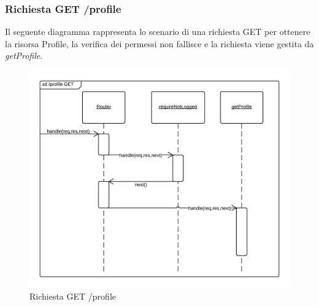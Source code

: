 \subsubsection{Richiesta GET /profile}
Il seguente diagramma rappresenta lo scenario di una richiesta GET per ottenere la risorsa Profile, la verifica dei permessi non fallisce e la richiesta viene gestita da \emph{getProfile}.
\begin{figure}[H]
	\begin{center} 
		\includegraphics[scale=0.20]{scenari/Profile GET.png} 
		\caption{Richiesta GET /profile}
	\end{center} 
\end{figure}

\pagebreak
